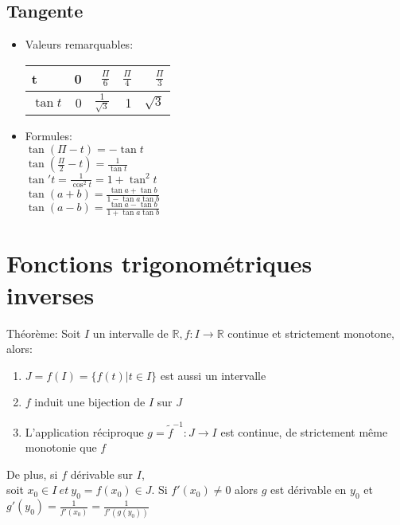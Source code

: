 \documentclass[fleqn]{article}
\begin{document}
\subsection{Tangente}
\begin{itemize}
	\item Valeurs remarquables: \\
	\begin{tabular}{lrrrr}
		\toprule
		t        & 0 & $\frac{\Pi}{6}$      & $\frac{\Pi}{4}$ & $\frac{\Pi}{3}$ \\
		\hline
		$\tan t$ & 0 & $\frac{1}{\sqrt{3}}$ & 1               & $\sqrt{3}$ \\
		\bottomrule
	\end{tabular}

	\item Formules: \\
	$\tan (\Pi-t) = -\tan t$ \\
	$\tan (\frac{\Pi}{2} - t) = \frac{1}{\tan t} $ \\
	\newline
	$\tan' t = \frac{1}{\cos^2 t} = 1 + \tan^2 t$ \\
	$\tan (a+b) = \frac{\tan a + \tan b}{1 - \tan a\tan b}$ \\
	$\tan (a-b) = \frac{\tan a - \tan b}{1 + \tan a\tan b}$ \\
\end{itemize}

\section{Fonctions trigonom\'etriques inverses}
Th\'eor\`eme: Soit \(I\) un intervalle de \(\mathbb{R}, f: I \rightarrow \mathbb{R}\) continue et strictement monotone, alors:
\begin{enumerate}
	\item \(J = f(I) = \{f(t)|t \in I\}\) est aussi un intervalle
	\item \(f\) induit une bijection de \(I\) sur \(J\)
	\item L'application r\'eciproque \(g = \tilde{f}^{-1}:J \rightarrow I\) est continue, de strictement m\^eme monotonie que \(f\)
\end{enumerate}
De plus, si \(f\) d\'erivable sur \(I\), \\
soit \(x_0 \in I\ et\ y_0 = f(x_0) \in J\). Si \(f'(x_0) \neq 0 \) alors \(g\) est d\'erivable en \(y_0\) et
\(g'(y_0) = \frac{1}{f'(x_0)} = \frac{1}{f'(g(y_0))}\) \\
\end{document}

